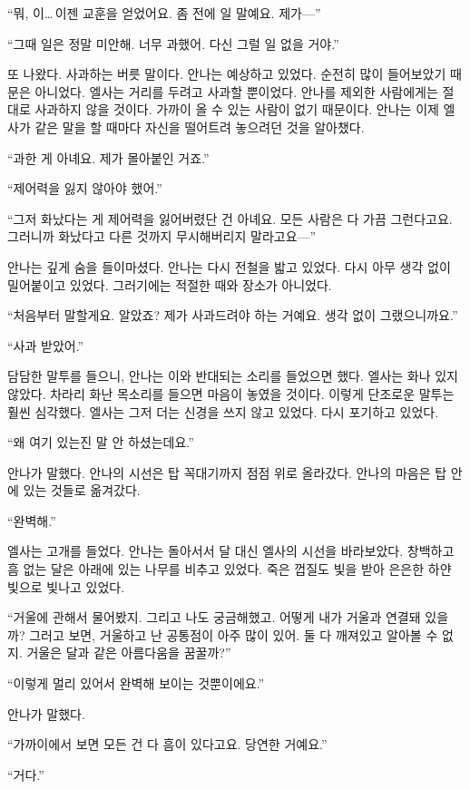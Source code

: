 ``뭐, 이\ldots\,이젠 교훈을 얻었어요. 좀 전에 일 말예요. 제가—''

``그때 일은 정말 미안해. 너무 과했어. 다신 그럴 일 없을 거야.''

또 나왔다. 사과하는 버릇 말이다. 안나는 예상하고 있었다. 순전히 많이 들어보았기 때문은 아니었다. 엘사는 거리를 두려고 사과할 뿐이었다. 안나를 제외한 사람에게는 절대로 사과하지 않을 것이다. 가까이 올 수 있는 사람이 없기 때문이다. 안나는 이제 엘사가 같은 말을 할 때마다 자신을 떨어트려 놓으려던 것을 알아챘다.

``과한 게 아녜요. 제가 몰아붙인 거죠.''

``제어력을 잃지 않아야 했어.''

``그저 화났다는 게 제어력을 잃어버렸단 건 아녜요. 모든 사람은 다 가끔 그런다고요. 그러니까 화났다고 다른 것까지 무시해버리지 말라고요—''

안나는 깊게 숨을 들이마셨다. 안나는 다시 전철을 밟고 있었다. 다시 아무 생각 없이 밀어붙이고 있었다. 그러기에는 적절한 때와 장소가 아니었다.

``처음부터 말할게요. 알았죠? 제가 사과드려야 하는 거예요. 생각 없이 그랬으니까요.''

``사과 받았어.''

담담한 말투를 들으니, 안나는 이와 반대되는 소리를 들었으면 했다. 엘사는 화나 있지 않았다. 차라리 화난 목소리를 들으면 마음이 놓였을 것이다. 이렇게 단조로운 말투는 훨씬 심각했다. 엘사는 그저 더는 신경을 쓰지 않고 있었다. 다시 포기하고 있었다.

``왜 여기 있는진 말 안 하셨는데요.''

안나가 말했다. 안나의 시선은 탑 꼭대기까지 점점 위로 올라갔다. 안나의 마음은 탑 안에 있는 것들로 옮겨갔다.

`` 완벽해.''

엘사는 고개를 들었다. 안나는 돌아서서 달 대신 엘사의 시선을 바라보았다. 창백하고 흠 없는 달은 아래에 있는 나무를 비추고 있었다. 죽은 껍질도 빛을 받아 은은한 하얀 빛으로 빛나고 있었다.

``거울에 관해서 물어봤지. 그리고 나도 궁금해했고. 어떻게 내가 거울과 연결돼 있을까? 그러고 보면, 거울하고 난 공통점이 아주 많이 있어. 둘 다 깨져있고 알아볼 수 없지. 거울은 달과 같은 아름다움을 꿈꿀까?''

``이렇게 멀리 있어서 완벽해 보이는 것뿐이에요.''

안나가 말했다.

``가까이에서 보면 모든 건 다 흠이 있다고요. 당연한 거예요.''

`` 거다.''

